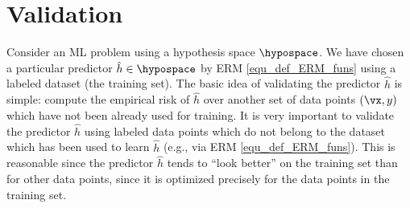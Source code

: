 \documentclass[12pt]{report}
\begin{document}
\section{Validation}
\label{sec_validate_predictor}

Consider an ML problem using a hypothesis space $\hypospace$. We have chosen a particular predictor 
$\hat{h} \in \hypospace$ by ERM \eqref{equ_def_ERM_funs} using a labeled dataset (the training set). The 
basic idea of validating the predictor $\hat{h}$ is simple: compute the empirical risk of $\hat{h}$ over another 
set of data points $(\vx,y)$ which have not been already used for training. It is very important to validate the 
predictor $\hat{h}$ using labeled data points which do not belong to the dataset which has been used to 
learn $\hat{h}$ (e.g., via ERM \eqref{equ_def_ERM_funs}). This is reasonable since the predictor $\hat{h}$ 
tends to ``look better'' on the training set than for other data points, since it is optimized precisely for the data 
points in the training set. 
\vspace*{2mm}
\begin{center}
\end{center}
 
\end{document}
